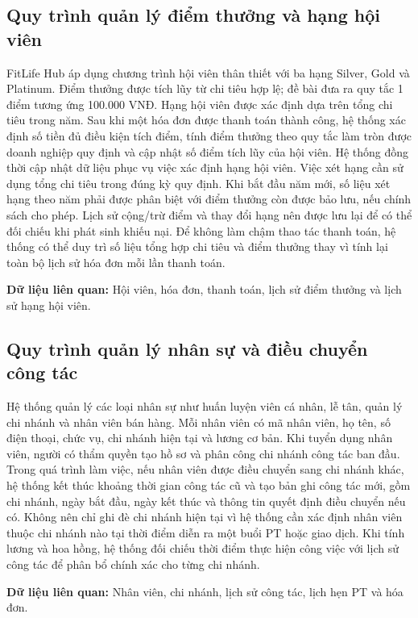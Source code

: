 \documentclass[11pt, a4paper]{article}
\begin{document}
\subsection{Quy trình quản lý điểm thưởng và hạng hội viên}
FitLife Hub áp dụng chương trình hội viên thân thiết với ba hạng Silver, Gold và Platinum. Điểm thưởng được tích lũy từ chi tiêu hợp lệ; đề bài đưa ra quy tắc 1 điểm tương ứng 100.000 VNĐ. Hạng hội viên được xác định dựa trên tổng chi tiêu trong năm. Sau khi một hóa đơn được thanh toán thành công, hệ thống xác định số tiền đủ điều kiện tích điểm, tính điểm thưởng theo quy tắc làm tròn được doanh nghiệp quy định và cập nhật số điểm tích lũy của hội viên. Hệ thống đồng thời cập nhật dữ liệu phục vụ việc xác định hạng hội viên. Việc xét hạng cần sử dụng tổng chi tiêu trong đúng kỳ quy định. Khi bắt đầu năm mới, số liệu xét hạng theo năm phải được phân biệt với điểm thưởng còn được bảo lưu, nếu chính sách cho phép. Lịch sử cộng/trừ điểm và thay đổi hạng nên được lưu lại để có thể đối chiếu khi phát sinh khiếu nại. Để không làm chậm thao tác thanh toán, hệ thống có thể duy trì số liệu tổng hợp chi tiêu và điểm thưởng thay vì tính lại toàn bộ lịch sử hóa đơn mỗi lần thanh toán.

\textbf{Dữ liệu liên quan:} Hội viên, hóa đơn, thanh toán, lịch sử điểm thưởng và lịch sử hạng hội viên.

\subsection{Quy trình quản lý nhân sự và điều chuyển công tác}
Hệ thống quản lý các loại nhân sự như huấn luyện viên cá nhân, lễ tân, quản lý chi nhánh và nhân viên bán hàng. Mỗi nhân viên có mã nhân viên, họ tên, số điện thoại, chức vụ, chi nhánh hiện tại và lương cơ bản. Khi tuyển dụng nhân viên, người có thẩm quyền tạo hồ sơ và phân công chi nhánh công tác ban đầu. Trong quá trình làm việc, nếu nhân viên được điều chuyển sang chi nhánh khác, hệ thống kết thúc khoảng thời gian công tác cũ và tạo bản ghi công tác mới, gồm chi nhánh, ngày bắt đầu, ngày kết thúc và thông tin quyết định điều chuyển nếu có. Không nên chỉ ghi đè chi nhánh hiện tại vì hệ thống cần xác định nhân viên thuộc chi nhánh nào tại thời điểm diễn ra một buổi PT hoặc giao dịch. Khi tính lương và hoa hồng, hệ thống đối chiếu thời điểm thực hiện công việc với lịch sử công tác để phân bổ chính xác cho từng chi nhánh.

\textbf{Dữ liệu liên quan:} Nhân viên, chi nhánh, lịch sử công tác, lịch hẹn PT và hóa đơn.
\end{document}
